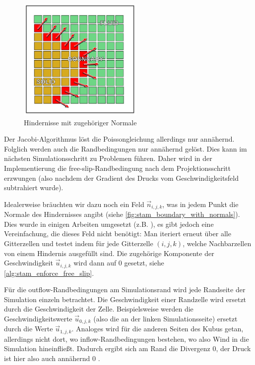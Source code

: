 \begin{figure}[ht]
\centering
\includegraphics[width=6cm]{images/boundary_with_normals}
\caption{Hindernisse mit zugehöriger Normale}
\label{fig:stam_boundary_with_normals}
\end{figure}

Der Jacobi-Algorithmus löst die Poissongleichung allerdings nur annähernd.
Folglich werden auch die Randbedingungen nur annähernd gelöst. Dies kann im
nächsten Simulationsschritt zu Problemen führen. Daher wird in der
Implementierung die free-slip-Randbedingung nach dem Projektionsschritt
erzwungen (also nachdem der Gradient des Drucks vom Geschwindigkeitsfeld
subtrahiert wurde).

Idealerweise bräuchten wir dazu noch ein Feld $\vec{n}_{i,j,k}$, was in jedem
Punkt die Normale des Hindernisses angibt (siehe
\autoref{fig:stam_boundary_with_normals}). Dies wurde in einigen
Arbeiten umgesetzt (z.B. \cite{Bordignon}), es gibt jedoch eine Vereinfachung,
die dieses Feld nicht benötigt: Man iteriert erneut über alle
Gitterzellen und testet indem für jede Gitterzelle $(i,j,k)$, welche
Nachbarzellen von einem Hindernis ausgefüllt sind. Die zugehörige
Komponente der Geschwindigkeit $\vec{u}_{i,j,k}$ wird dann auf 0
gesetzt, siehe \autoref{alg:stam_enforce_free_slip}.

Für die outflow-Randbedingungen am Simulationsrand wird jede Randseite der
Simulation einzeln betrachtet. Die Geschwindigkeit einer Randzelle wird ersetzt
durch die Geschwindigkeit der  Zelle.
Beispielsweise werden die Geschwindigkeitswerte $\vec{u}_{0,j,k}$ (also die an
der linken Simulationsseite) ersetzt durch die Werte $\vec{u}_{1,j,k}$. Analoges
wird für die anderen Seiten des Kubus getan, allerdings nicht dort, wo
inflow-Randbedingungen bestehen, wo also Wind in die Simulation hineinfließt.
Dadurch ergibt sich am Rand die Divergenz 0, der Druck ist hier also auch
annähernd 0 .

